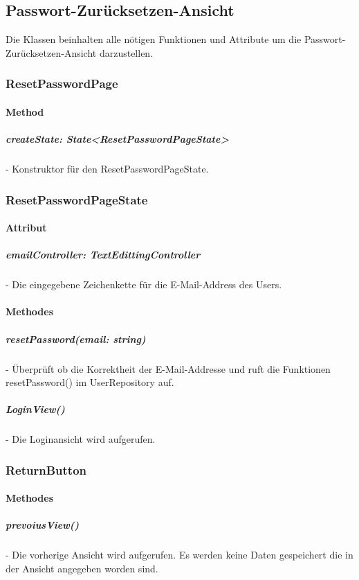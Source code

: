 \documentclass[parskip=full]{scrartcl}
\begin{document}
    \newpage

\subsection{Passwort-Zurücksetzen-Ansicht}
    Die Klassen beinhalten alle nötigen Funktionen und Attribute um die Passwort-Zurücksetzen-Ansicht darzustellen.
    
    \subsubsection{ResetPasswordPage}
        \paragraph*{Method}
            \subparagraph*{createState: State<ResetPasswordPageState>} - Konstruktor für den ResetPasswordPageState.
    
    \subsubsection{ResetPasswordPageState}
        \paragraph*{Attribut}
            \subparagraph*{emailController: TextEdittingController} - Die eingegebene Zeichenkette für die E-Mail-Address des Users.
    
        \paragraph*{Methodes}
            \subparagraph*{resetPassword(email: string)} - Überprüft ob die Korrektheit der E-Mail-Addresse und ruft die Funktionen resetPassword() im UserRepository auf.
            \subparagraph*{LoginView()} - Die Loginansicht wird aufgerufen.

    \subsubsection{ReturnButton} \label{sec:ReturnButton}
        \paragraph*{Methodes}
            \subparagraph*{prevoiusView()} - Die vorherige Ansicht wird aufgerufen. Es werden keine Daten gespeichert die in der Ansicht angegeben worden sind.
    
\end{document}
